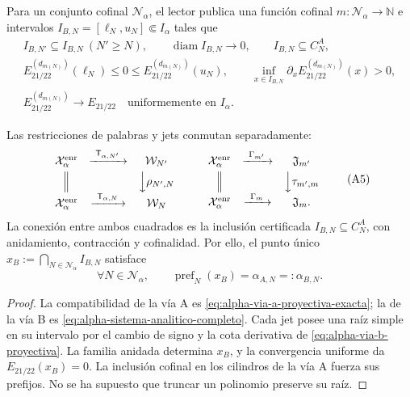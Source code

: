 Para un conjunto cofinal \(\mathcal N_\alpha\), el lector publica una función
cofinal \(m:\mathcal N_\alpha\to\mathbb N\) e intervalos
\(I_{B,N}=[\ell_N,u_N]\Subset I_\alpha\) tales que
\begin{equation}
\begin{gathered}
 I_{B,N'}\subseteq I_{B,N}\ (N'\ge N),\qquad
 \operatorname{diam}I_{B,N}\longrightarrow0,\qquad
 I_{B,N}\subseteq C_N^A,\\
 E_{21/22}^{(d_{m(N)})}(\ell_N)\le0\le
 E_{21/22}^{(d_{m(N)})}(u_N),\qquad
 \inf_{x\in I_{B,N}}\partial_xE_{21/22}^{(d_{m(N)})}(x)>0,\\
 E_{21/22}^{(d_{m(N)})}\longrightarrow E_{21/22}
 \quad\text{uniformemente en }I_\alpha .
\end{gathered}
 \tag{A4}
 \label{eq:alpha-via-b-proyectiva}
\end{equation}

\begin{proposition}
\label{prop:alpha-cuadrados-compatibilidad}
Las restricciones de palabras y jets conmutan separadamente:
\[
\begin{array}{ccc}
 \mathcal X_\alpha^{\mathrm{enr}}&
 \xrightarrow{\ \mathsf T_{\alpha,N'}\ }&\mathcal W_{N'}\\[1mm]
 \Big\Vert&&\Big\downarrow\rho_{N',N}\\[1mm]
 \mathcal X_\alpha^{\mathrm{enr}}&
 \xrightarrow{\ \mathsf T_{\alpha,N}\ }&\mathcal W_N
\end{array}
\qquad
\begin{array}{ccc}
 \mathcal X_\alpha^{\mathrm{enr}}&
 \xrightarrow{\ \Gamma_{m'}\ }&\mathfrak J_{m'}\\[1mm]
 \Big\Vert&&\Big\downarrow\tau_{m',m}\\[1mm]
 \mathcal X_\alpha^{\mathrm{enr}}&
 \xrightarrow{\ \Gamma_m\ }&\mathfrak J_m .
\end{array}
 \tag{A5}
\]
La conexión entre ambos cuadrados es la inclusión certificada
\(I_{B,N}\subseteq C_N^A\), con anidamiento, contracción y cofinalidad. Por
ello, el punto único
\(x_B:=\bigcap_{N\in\mathcal N_\alpha}I_{B,N}\) satisface
\begin{equation}
 \forall N\in\mathcal N_\alpha,\qquad
 \operatorname{pref}_N(x_B)=\alpha_{A,N}=:\alpha_{B,N}.
 \tag{A6}
 \label{eq:alpha-igualdad-cada-nivel}
\end{equation}
\end{proposition}

\begin{proof}
La compatibilidad de la vía A es
\eqref{eq:alpha-via-a-proyectiva-exacta}; la de la vía B es
\eqref{eq:alpha-sistema-analitico-completo}. Cada jet posee una raíz simple
en su intervalo por el cambio de signo y la cota derivativa de
\eqref{eq:alpha-via-b-proyectiva}. La familia anidada determina \(x_B\), y la
convergencia uniforme da \(E_{21/22}(x_B)=0\). La inclusión cofinal en los
cilindros de la vía A fuerza sus prefijos. No se ha supuesto que truncar un
polinomio preserve su raíz.
\end{proof}

